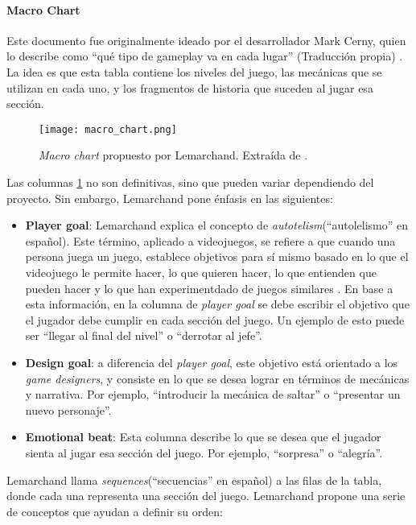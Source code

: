 \paragraph{Macro Chart}  Este documento fue originalmente ideado por el desarrollador Mark Cerny, quien lo describe como ``qué tipo de gameplay va en cada lugar'' (Traducción propia) \cite{academyofinteractivearts&sciencesDICESummit20022012}. La idea es que esta tabla contiene los niveles del juego, las mecánicas que se utilizan en cada uno, y los fragmentos de historia que suceden al jugar esa sección.
%
\begin{figure}[h]
    \centering
    \texttt{[image: macro\_chart.png]}
    \caption{\textit{Macro chart} propuesto por Lemarchand. Extraída de \cite{lemarchandPlayfulProductionProcess2021}.}
    \label{fig:x macro chart}
\end{figure}
%
\par Las columnas \ref{fig:x macro chart} no son definitivas, sino que pueden variar dependiendo del proyecto. Sin embargo, Lemarchand pone énfasis en las siguientes:
\begin{itemize}
    \item \textbf{Player goal}: Lemarchand explica el concepto de \textit{autotelism}(``autolelismo'' en español). Este término, aplicado a videojuegos, se refiere a que cuando una persona juega un juego, establece objetivos para sí mismo basado en lo que el videojuego le permite hacer, lo que quieren hacer, lo que entienden que pueden hacer y lo que han experimentdado de juegos similares \cite{lemarchandPlayfulProductionProcess2021}. En base a esta información, en la columna de \textit{player goal} se debe escribir el objetivo que el jugador debe cumplir en cada sección del juego. Un ejemplo de esto puede ser ``llegar al final del nivel'' o ``derrotar al jefe''.
    \item \textbf{Design goal}: a diferencia del \textit{player goal}, este objetivo está orientado a los \textit{game designers}, y consiste en lo que se desea lograr en términos de mecánicas y narrativa. Por ejemplo, ``introducir la mecánica de saltar'' o ``presentar un nuevo personaje''.
    \item \textbf{Emotional beat}: Esta columna describe lo que se desea que el jugador sienta al jugar esa sección del juego. Por ejemplo, ``sorpresa'' o ``alegría''.
\end 
{itemize}
\par Lemarchand llama \textit{sequences}(``secuencias'' en español) a las filas de la tabla, donde cada una representa una sección del juego. Lemarchand propone una serie de conceptos que ayudan a definir su orden:  %
